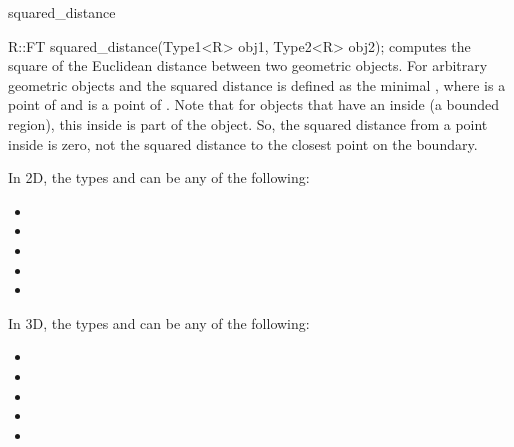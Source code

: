 \begin{ccRefFunction}{squared_distance}
\\

{R::FT squared_distance(Type1<R> obj1, Type2<R> obj2);}
{computes the square of the Euclidean distance between two geometric objects. 
For arbitrary geometric objects  and
 the squared distance is defined as the minimal
, where  is a point of
 and  is a point of .
Note that for objects that have an inside (a bounded region), this inside 
is part of the object. So, the squared distance from a point inside is 
zero, not the squared distance to the closest point on the boundary.}

In 2D, the types  and  can be any of the
following:
\begin{itemize}
\item {}
\item {}
\item {}
\item {}
\item {}
\end{itemize}

In 3D, the types  and  can be any of the
following:
\begin{itemize}
\item {}
\item {}
\item {}
\item {}
\item {}
\end{itemize}

\ccSeeAlso
{} \\
 \\
 \\
 \\
 \\
 \\
 \\
\\
 \\

\end{ccRefFunction}
